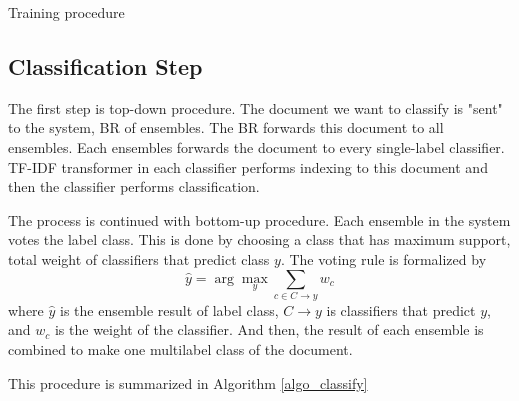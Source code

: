 \documentclass[conference]{IEEEtran}
\makeatletter
\def\BState{\State\hskip-\ALG@thistlm}
\newcommand{\argmax}{\arg\!\max}
\makeatother
\begin{document}
\begin{algorithm}[!htb]
\caption{Training procedure}
\label{algo_train}
\end{algorithm}

\subsection{Classification Step}

The first step is top-down procedure.
The document we want to classify is "sent" to the system, BR of ensembles.
The BR forwards this document to all ensembles.
Each ensembles forwards the document to every single-label classifier.
TF-IDF transformer in each classifier performs indexing to this document and then the classifier performs classification.

The process is continued with bottom-up procedure.
Each ensemble in the system votes the label class.
This is done by choosing a class that has maximum support, total weight of classifiers that predict class $y$.
The voting rule is formalized by
\[\hat{y} = \argmax_y \sum_{c \in C \rightarrow y} w_c\]
where $\hat{y}$ is the ensemble result of label class, $C \rightarrow y$ is classifiers that predict $y$, and $w_c$ is the weight of the classifier.
And then, the result of each ensemble is combined to make one multilabel class of the document.

This procedure is summarized in Algorithm \ref{algo_classify}
\end{document}
